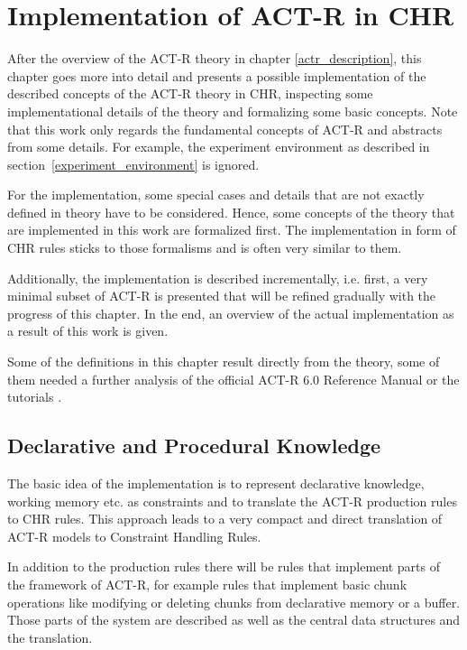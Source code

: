 \chapter{Implementation of ACT-R in CHR}
\label{implementation}

After the overview of the ACT-R theory in chapter \ref{actr_description}, this chapter goes more into detail and presents a possible implementation of the described concepts of the ACT-R theory in CHR, inspecting some implementational details of the theory and formalizing some basic concepts. Note that this work only regards the fundamental concepts of ACT-R and abstracts from some details. For example, the experiment environment as described in section~\ref{experiment_environment} is ignored.

For the implementation, some special cases and details that are not exactly defined in theory have to be considered. Hence, some concepts of the theory that are implemented in this work are formalized first. The implementation in form of CHR rules sticks to those formalisms and is often very similar to them.

Additionally, the implementation is described incrementally, i.e. first, a very minimal subset of ACT-R is presented that will be refined gradually with the progress of this chapter. In the end, an overview of the actual implementation as a result of this work is given.

Some of the definitions in this chapter result directly from the theory, some of them needed a further analysis of the official ACT-R 6.0 Reference Manual \cite{actr_reference} or the tutorials \cite{actr_tutorial}. 

\section{Declarative and Procedural Knowledge}

The basic idea of the implementation is to represent declarative knowledge, working memory etc. as constraints and to translate the ACT-R production rules to CHR rules. This approach leads to a very compact and direct translation of ACT-R models to Constraint Handling Rules.

In addition to the production rules there will be rules that implement parts of the framework of ACT-R, for example rules that implement basic chunk operations like modifying or deleting chunks from declarative memory or a buffer. Those parts of the system are described as well as the central data structures and the translation.

